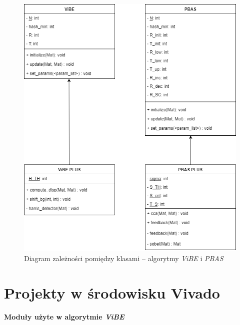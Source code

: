 		\begin{figure}[h!]
				\centering
				\includegraphics[scale = 0.6]{img/appx/vibe_pbas_architecture.png}
				\caption{Diagram zależności pomiędzy klasami -- algorytmy \textit{ViBE} i \textit{PBAS}}
				\label{fig:vibe_pbas_diagram}
		\end{figure}

\section*{Projekty w środowisku Vivado}

\paragraph*{Moduły użyte w algorytmie \textit{ViBE}}

